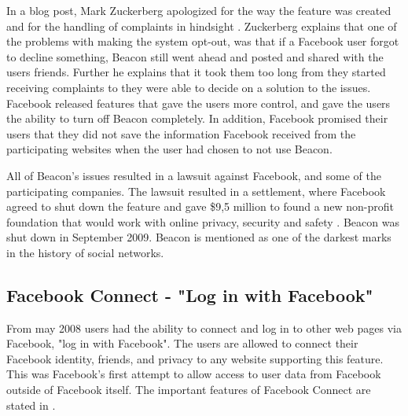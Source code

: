 In a blog post, Mark Zuckerberg apologized for the way the feature was created and for the handling of complaints in hindsight \cite{Beacon}. Zuckerberg explains that one of the problems with making the system opt-out, was that if a Facebook user forgot to decline something, Beacon still went ahead and posted and shared with the users friends. Further he explains that it took them too long from they started receiving complaints to they were able to decide on a solution to the issues. Facebook released features that gave the users more control, and gave the users the ability to turn off Beacon completely. In addition, Facebook promised their users that they did not save the information Facebook received from the participating websites when the user had chosen to not use Beacon. 

All of Beacon's issues resulted in a lawsuit against Facebook, and some of the participating companies. The lawsuit resulted in a settlement, where Facebook agreed to shut down the feature and gave \$9,5 million to found a new non-profit foundation that would work with online privacy, security and safety \cite{lawsuitB}. Beacon was shut down in September 2009. Beacon is mentioned as one of the darkest marks in the history of social networks.

\subsection{Facebook Connect - "Log in with Facebook"}
From may 2008 users had the ability to connect and log in to other web pages via Facebook, "log in with Facebook". The users are allowed to connect their Facebook identity, friends, and privacy to any website supporting this feature. This was Facebook's first attempt to allow access to user data from Facebook outside of Facebook itself. The important features of Facebook Connect are stated in .

